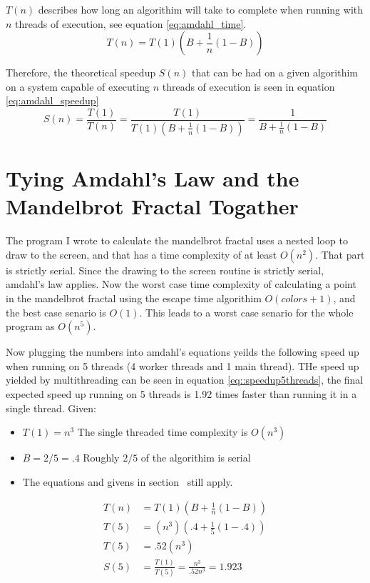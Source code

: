 \documentclass[10pt,oneside,letter]{article}
\begin{document}
$T(n)$ describes how long an algorithim will take to complete when running
with $n$ threads of execution, see equation \eqref{eq:amdahl_time}.
\begin{equation} \label{eq:amdahl_time}
    T(n) = T(1)(B + \frac{1}{n}(1-B))
\end{equation}

Therefore, the theoretical speedup $S(n)$ that can be had on a given algorithim
on a system capable of executing $n$ threads of execution is seen in equation
\eqref{eq:amdahl_speedup}
\begin{equation} \label{eq:amdahl_speedup}
    S(n) = \frac{T(1)}{T(n)}
         = \frac{T(1)}{T(1)(B+\frac{1}{n}(1-B))}
         = \frac{1}{B+\frac{1}{n}(1-B)}
\end{equation}

\section{Tying Amdahl's Law and the Mandelbrot Fractal Togather}
The program I wrote to calculate the mandelbrot fractal uses a nested loop to
draw to the screen, and that has a time complexity of at least $O(n^2)$. That
part is strictly serial. Since the drawing to the screen routine is strictly
serial, amdahl's law applies. Now the worst case time complexity of calculating a
point in the mandelbrot fractal using the escape time algorithim $O({colors} + 1)$,
and the best case senario is $O(1)$. This leads to a worst case senario for the
whole program as $O(n^5)$.

Now plugging the numbers into amdahl's equations yeilds the following speed up
when running on 5 threads (4 worker threads and 1 main thread). THe speed up
yielded by multithreading can be seen in equation \eqref{eq::speedup5threads},
the final expected speed up running on 5 threads is 1.92 times faster than running
it in a single thread.
Given:
\begin{itemize}
    \item $T(1) = n^3$ The single threaded time complexity is $O(n^3)$
    \item $B = 2/5 = .4$ Roughly $2/5$ of the algorithim is serial
    \item The equations and givens in section~\pageref{sec:Ahmdahl's Law} still apply.
\end{itemize}

\begin{equation} \label{eq:speedup5threads}
    \begin{align}
        T(n)&= T(1)(B + \frac{1}{n}(1-B))\\
        T(5)&= (n^3)(.4 + \frac{1}{5}(1-.4))\\
        T(5)&= .52(n^3)\\
        S(5)&= \frac{T(1)}{T(5)} = \frac{n^3}{.52n^3} = 1.923
    \end{align}
\end{equation}
\end{document}
